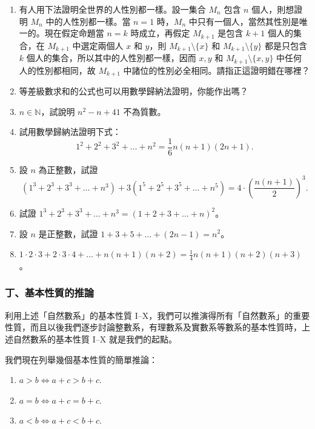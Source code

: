 \begin{enumerate}[1., leftmargin=2em]
  \item 有人用下法證明全世界的人性別都一樣。設一集合 $M_n$ 包含 $n$ 個人，則想證明 $M_n$ 中的人性別都一樣。當 $n=1$ 時，$M_n$ 中只有一個人，當然其性別是唯一的。現在假定命題當 $n=k$ 時成立，再假定 $M_{k+1}$ 是包含 $k+1$ 個人的集合，在 $M_{k+1}$ 中選定兩個人 $x$ 和 $y$，則 $M_{k+1} \setminus \{x\}$ 和 $M_{k+1} \setminus \{y\}$ 都是只包含 $k$ 個人的集合，所以其中的人性別都一樣，因而 $x, y$ 和 $M_{k+1} \setminus \{x, y\}$ 中任何人的性別都相同，故 $M_{k+1}$ 中諸位的性別必全相同。請指正這證明錯在哪裡？
  \item 等差級數求和的公式也可以用數學歸納法證明，你能作出嗎？
  \item $n \in \mathbb{N}$，試說明 $n^2 - n + 41$ 不為質數。
  \item 試用數學歸納法證明下式：
  \begin{equation*}
    1^2 + 2^2 + 3^2 + \dots + n^2 = \frac{1}{6}n(n+1)(2n+1).
  \end{equation*}
  \item 設 $n$ 為正整數，試證
  \begin{equation*}
    (1^3 + 2^3 + 3^3 + \dots + n^3) + 3(1^5 + 2^5 + 3^5 + \dots + n^5) = 4 \cdot \left(\frac{n(n+1)}{2}\right)^3.
  \end{equation*}
  \item 試證 $1^3 + 2^3 + 3^3 + \dots + n^3 = (1+2+3+\dots+n)^2$。
  \item 設 $n$ 是正整數，試證 $1 + 3 + 5 + \dots + (2n-1) = n^2$。
  \item $1 \cdot 2 \cdot 3 + 2 \cdot 3 \cdot 4 + \dots + n(n+1)(n+2) = \frac{1}{4}n(n+1)(n+2)(n+3)$。
\end{enumerate}

\subsubsection*{丁、基本性質的推論}\label{subsec:nat_corollaries}

利用上述「自然數系」的基本性質 I--X，我們可以推演得所有「自然數系」的重要性質，而且以後我們逐步討論整數系，有理數系及實數系等數系的基本性質時，上述自然數系的基本性質 I--X 就是我們的起點。

我們現在列舉幾個基本性質的簡單推論：

\begin{enumerate}[(1)]
  \item $a > b \iff a+c > b+c$.
  \item $a = b \iff a+c = b+c$.
  \item $a < b \iff a+c < b+c$.
\end{enumerate}


